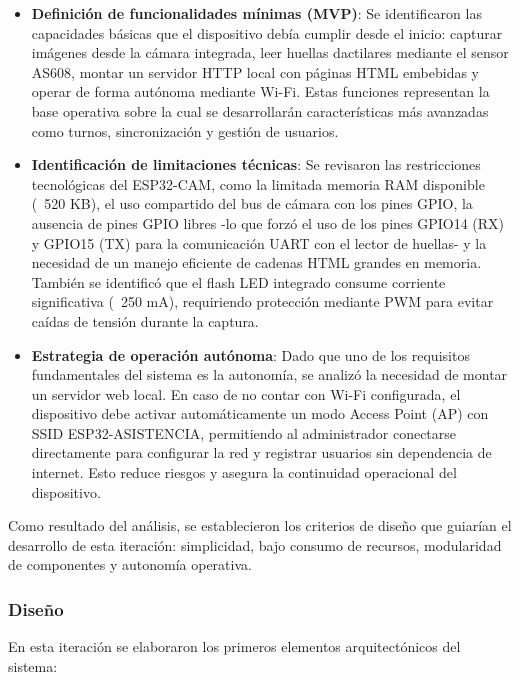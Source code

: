 \begin{itemize}
    \item \textbf{Definición de funcionalidades mínimas (MVP)}:  
    Se identificaron las capacidades básicas que el dispositivo debía cumplir desde el inicio: capturar imágenes desde la cámara integrada, leer huellas dactilares mediante el sensor AS608, montar un servidor HTTP local con páginas HTML embebidas y operar de forma autónoma mediante Wi-Fi. Estas funciones representan la base operativa sobre la cual se desarrollarán características más avanzadas como turnos, sincronización y gestión de usuarios.

    \item \textbf{Identificación de limitaciones técnicas}:  
    Se revisaron las restricciones tecnológicas del ESP32-CAM, como la limitada memoria RAM disponible (~520 KB), el uso compartido del bus de cámara con los pines GPIO, la ausencia de pines GPIO libres -lo que forzó el uso de los pines GPIO14 (RX) y GPIO15 (TX) para la comunicación UART con el lector de huellas- y la necesidad de un manejo eficiente de cadenas HTML grandes en memoria. También se identificó que el flash LED integrado consume corriente significativa (~250 mA), requiriendo protección mediante PWM para evitar caídas de tensión durante la captura.

    \item \textbf{Estrategia de operación autónoma}:  
    Dado que uno de los requisitos fundamentales del sistema es la autonomía, se analizó la necesidad de montar un servidor web local. En caso de no contar con Wi-Fi configurada, el dispositivo debe activar automáticamente un modo Access Point (AP) con SSID ESP32-ASISTENCIA, permitiendo al administrador conectarse directamente para configurar la red y registrar usuarios sin dependencia de internet. Esto reduce riesgos y asegura la continuidad operacional del dispositivo.
\end{itemize}

Como resultado del análisis, se establecieron los criterios de diseño que guiarían el desarrollo de esta iteración: simplicidad, bajo consumo de recursos, modularidad de componentes y autonomía operativa.

\subsubsection{Diseño}

En esta iteración se elaboraron los primeros elementos arquitectónicos del sistema:

